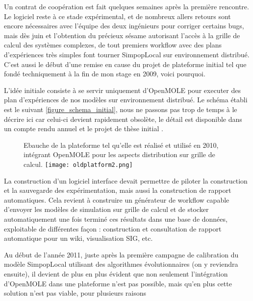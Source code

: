 Un contrat de coopération est fait quelques semaines après la première rencontre. Le logiciel reste à ce stade expérimental, et de nombreux allers retours sont encore nécessaires avec l'équipe des deux ingénieurs pour corriger certains bugs, mais dès juin et l'obtention du précieux sésame autorisant l'accès à la grille de calcul des systèmes complexes, de tout premiers workflow avec des plans d'expériences très simples font tourner SimpopLocal sur environnement distribué. C'est aussi le début d'une remise en cause du projet de plateforme initial tel que fondé techniquement à la fin de mon stage en 2009, voici pourquoi.

L'idée initiale consiste à se servir uniquement d'OpenMOLE pour executer des plan d'expériences de nos modèles sur environnement distribué. Le schéma établi est le suivant \ref{figure_schema_initial}, nous ne passons pas trop de temps à le décrire ici car celui-ci devient rapidement obsolète, le détail est disponible dans un compte rendu annuel et le projet de thèse initial \autocites{Rey2010,Rey2009}.

\begin{figure}[!hbtp]
	\begin{sidecaption}[fortoc]{Ebauche de la plateforme tel qu'elle est réalisé et utilisé en 2010, intégrant OpenMOLE pour les aspects distribution sur grille de calcul.}
	 \centering
	 	\texttt{[image: oldplatform2.png]}
 \end{sidecaption}
\end{figure}

La construction d'un logiciel interface devait permettre de piloter la construction et la sauvegarde des expérimentation, mais aussi la construction de rapport automatiques. Cela revient à construire un générateur de workflow capable d'envoyer les modèles de simulation sur grille de calcul et de stocker automatiquement une fois terminé ces résultats dans une base de données, exploitable de différentes façon : construction et consultation de rapport automatique pour un wiki, visualisation SIG, etc.

Au début de l'année 2011, juste après la première campagne de calibration du modèle SimpopLocal utilisant des algorithmes évolutionnaires (on y reviendra ensuite), il devient de plus en plus évident que non seulement l'intégration d'OpenMOLE dans une plateforme n'est pas possible, mais qu'en plus cette solution n'est pas viable, pour plusieurs raisons


